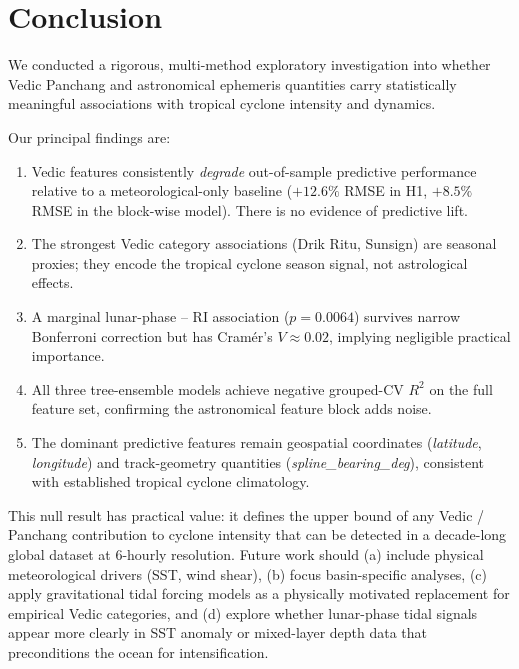 \documentclass[12pt,a4paper]{article}
\begin{document}
\section{Conclusion}

We conducted a rigorous, multi-method exploratory investigation into whether
Vedic Panchang and astronomical ephemeris quantities carry statistically meaningful
associations with tropical cyclone intensity and dynamics.

Our principal findings are:
\begin{enumerate}
  \item Vedic features consistently \emph{degrade} out-of-sample predictive
        performance relative to a meteorological-only baseline ($+12.6\%$ RMSE in H1,
        $+8.5\%$ RMSE in the block-wise model). There is no evidence of predictive lift.
  \item The strongest Vedic category associations (Drik Ritu, Sunsign) are seasonal
        proxies; they encode the tropical cyclone season signal, not astrological effects.
  \item A marginal lunar-phase -- RI association ($p = 0.0064$) survives narrow
        Bonferroni correction but has Cram\'er's $V \approx 0.02$, implying negligible
        practical importance.
  \item All three tree-ensemble models achieve negative grouped-CV $R^2$ on the full
        feature set, confirming the astronomical feature block adds noise.
  \item The dominant predictive features remain geospatial coordinates
        (\textit{latitude}, \textit{longitude}) and track-geometry quantities
        (\textit{spline\_bearing\_deg}), consistent with established tropical
        cyclone climatology.
\end{enumerate}

This null result has practical value: it defines the upper bound of any Vedic /
Panchang contribution to cyclone intensity that can be detected in a decade-long
global dataset at 6-hourly resolution. Future work should (a) include physical
meteorological drivers (SST, wind shear), (b) focus basin-specific analyses,
(c) apply gravitational tidal forcing models as a physically motivated replacement
for empirical Vedic categories, and (d) explore whether lunar-phase tidal signals
appear more clearly in SST anomaly or mixed-layer depth data that preconditions
the ocean for intensification.
\end{document}
